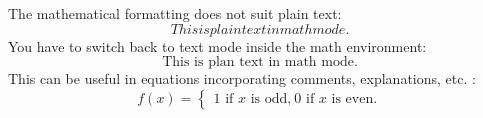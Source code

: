 \documentclass[a4paper]{article}
\begin{document}
\pagestyle{empty}


The mathematical formatting does not suit plain text:
\begin{equation}
	This is plain text in math mode.
\end{equation}
You have to switch back to text mode inside the math environment:
\begin{equation}
	\textrm{This is plan text in math mode.}
\end{equation}
This can be useful in equations incorporating comments, explanations, etc. :
\begin{equation}
	f(x) = \left\{ \begin{array}{l} \textrm{$1$ if $x$ is odd,} \
\textrm{$0$ if $x$ is even.} \end{array}\right.
\end{equation}
\end{document}
